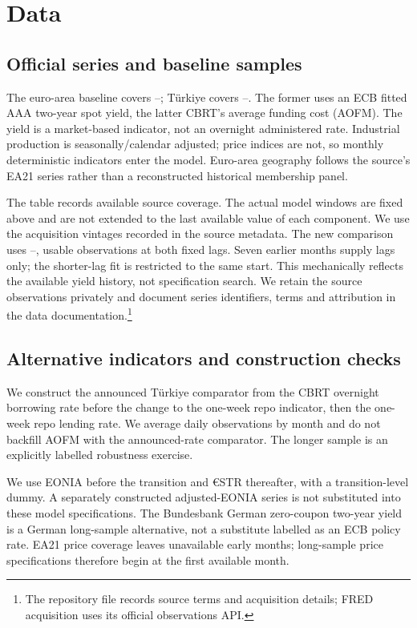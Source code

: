 \section{Data}
\subsection{Official series and baseline samples}
The euro-area baseline covers \EAStart{}--\EAEnd{}; Türkiye covers \TRStart{}--\TREnd{}. The former uses an ECB fitted AAA two-year spot yield, the latter CBRT's average funding cost (AOFM). The yield is a market-based indicator, not an overnight administered rate. Industrial production is seasonally/calendar adjusted; price indices are not, so monthly deterministic indicators enter the model. Euro-area geography follows the source's EA21 series rather than a reconstructed historical membership panel.

The table records available source coverage. The actual model windows are fixed above and are not extended to the last available value of each component. We use the acquisition vintages recorded in the source metadata. The new comparison uses \ComparisonStart{}–\ComparisonEnd{}, \ComparisonN{} usable observations at both fixed lags. Seven earlier months supply lags only; the shorter-lag fit is restricted to the same start. This mechanically reflects the available yield history, not specification search. We retain the source observations privately and document series identifiers, terms and attribution in the data documentation.\footnote{The repository file  records source terms and acquisition details; FRED acquisition uses its official observations API.}
\subsection{Alternative indicators and construction checks}

We construct the announced Türkiye comparator from the CBRT overnight borrowing rate before the change to the one-week repo indicator, then the one-week repo lending rate. We average daily observations by month and do not backfill AOFM with the announced-rate comparator. The longer sample is an explicitly labelled robustness exercise.

We use EONIA before the transition and €STR thereafter, with a transition-level dummy. A separately constructed adjusted-EONIA series is not substituted into these model specifications. The Bundesbank German zero-coupon two-year yield is a German long-sample alternative, not a substitute labelled as an ECB policy rate. EA21 price coverage leaves \MissingEarlyHICP{} unavailable early months; long-sample price specifications therefore begin at the first available month.

